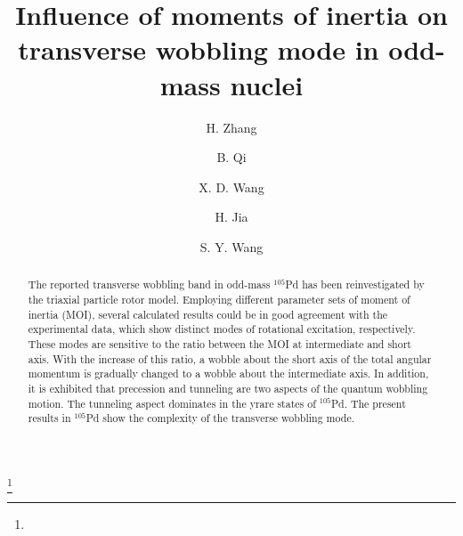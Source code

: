 \documentclass[aps,prc,preprint,showpacs,groupedaddress,floatfix,amsmath,amssymb]{revtex4-1}
\begin{document}
\title{Influence of moments of inertia on transverse wobbling mode in odd-mass nuclei}
\author{H. Zhang}
\author{B. Qi}\thanks{}
\author{X. D. Wang}
\author{H. Jia}
\author{S. Y. Wang}


\begin{abstract}
The reported transverse wobbling band in odd-mass $^{105}$Pd has been reinvestigated
by the triaxial particle rotor model. Employing different parameter sets of moment of inertia (MOI),  several calculated results could be in good agreement with the experimental data, which show
distinct modes of rotational excitation, respectively.
These modes are sensitive to the ratio
between the MOI at intermediate and short axis. With the increase of this ratio, a wobble about the short axis of the total angular momentum  is gradually changed  to a wobble about the intermediate axis.
In addition, it is exhibited that
precession and tunneling are two aspects of the quantum wobbling motion. The tunneling aspect dominates
in the yrare states of $^{105}$Pd.
The present results in $^{105}$Pd show the complexity of the transverse wobbling mode.
\end{abstract}

\maketitle
\end{document}
